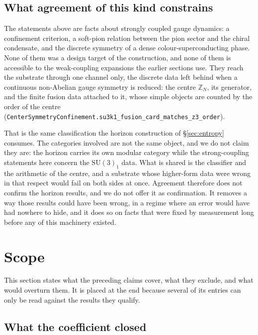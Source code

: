 \documentclass[aps,prd,nofootinbib,superscriptaddress,12pt]{revtex4-2}
\DeclareRobustCommand{\lb}{\discretionary{}{}{}}
\begin{document}
\subsection{What agreement of this kind constrains}

The statements above are facts about strongly coupled gauge dynamics: a
confinement criterion, a soft-pion relation between the pion sector and the
chiral condensate, and the discrete symmetry of a dense colour-superconducting
phase. None of them was a design target of the construction, and none of them is
accessible to the weak-coupling expansions the earlier sections use. They reach
the substrate through one channel only, the discrete data left behind when a
continuous non-Abelian gauge symmetry is reduced: the centre $\mathbb{Z}_N$, its
generator, and the finite fusion data attached to it, whose simple objects are
counted by the order of the centre
(\texttt{Center\lb{}Symmetry\lb{}Confinement.\lb{}su3k1\_\lb{}fusion\_\lb{}card\_\lb{}matches\_\lb{}z3\_\lb{}order}).

That is the same classification the horizon construction of
\S\ref{sec:entropy} consumes. The categories involved are not the same object,
and we do not claim they are: the horizon carries its own modular category while
the strong-coupling statements here concern the $\mathrm{SU}(3)_1$ data. What is
shared is the classifier and the arithmetic of the centre, and a substrate whose
higher-form data were wrong in that respect would fail on both sides at once.
Agreement therefore does not confirm the horizon results, and we do not offer it
as confirmation. It removes a way those results could have been wrong, in a
regime where an error would have had nowhere to hide, and it does so on facts
that were fixed by measurement long before any of this machinery existed.

\section{Scope}
\label{sec:scope}

This section states what the preceding claims cover, what they exclude, and what
would overturn them. It is placed at the end because several of its entries can
only be read against the results they qualify.

\subsection{What the coefficient closed}
\label{sec:scope-closures}
\end{document}
